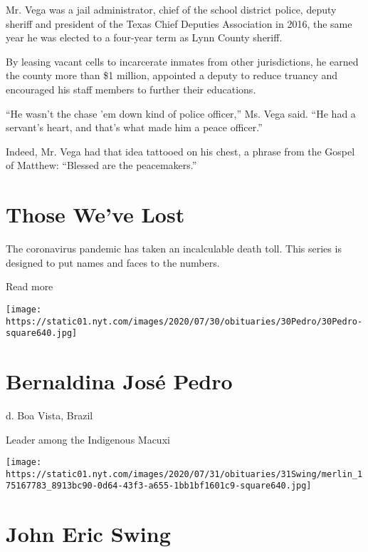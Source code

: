Mr. Vega was a jail administrator, chief of the school district police,
deputy sheriff and president of the Texas Chief Deputies Association in
2016, the same year he was elected to a four-year term as Lynn County
sheriff.

By leasing vacant cells to incarcerate inmates from other jurisdictions,
he earned the county more than \$1 million, appointed a deputy to reduce
truancy and encouraged his staff members to further their educations.

``He wasn't the chase 'em down kind of police officer,'' Ms. Vega said.
``He had a servant's heart, and that's what made him a peace officer.''

Indeed, Mr. Vega had that idea tattooed on his chest, a phrase from the
Gospel of Matthew: ``Blessed are the peacemakers.''

\href{https://www.nytimes.com/interactive/2020/obituaries/people-died-coronavirus-obituaries.html?action=click\&pgtype=Article\&state=default\&region=BELOW_MAIN_CONTENT\&context=covid_obits_promo}{}

\hypertarget{those-weve-lost}{%
\section{Those We've Lost}\label{those-weve-lost}}

The coronavirus pandemic has taken an incalculable death toll. This
series is designed to put names and faces to the numbers.

Read more

\texttt{[image: https://static01.nyt.com/images/2020/07/30/obituaries/30Pedro/30Pedro-square640.jpg]}

\hypertarget{bernaldina-josuxe9-pedro}{%
\section{Bernaldina José Pedro}\label{bernaldina-josuxe9-pedro}}

d. Boa Vista, Brazil

Leader among the Indigenous Macuxi

\texttt{[image: https://static01.nyt.com/images/2020/07/31/obituaries/31Swing/merlin\_175167783\_8913bc90-0d64-43f3-a655-1bb1bf1601c9-square640.jpg]}

\hypertarget{john-eric-swing}{%
\section{John Eric Swing}\label{john-eric-swing}}

